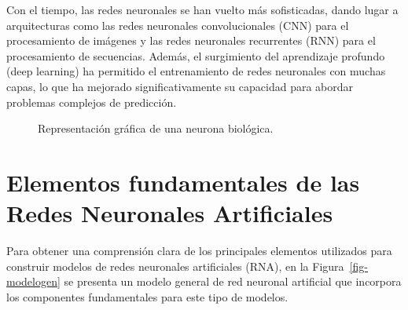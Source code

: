 \documentclass[
  us-letterpaper,
]{scrreprt}
\theoremstyle{plain}
\theoremstyle{definition}
\theoremstyle{definition}
\theoremstyle{plain}
\theoremstyle{remark}
\begin{document}
Con el tiempo, las redes neuronales se han vuelto más sofisticadas,
dando lugar a arquitecturas como las redes neuronales convolucionales
(CNN) para el procesamiento de imágenes y las redes neuronales
recurrentes (RNN) para el procesamiento de secuencias. Además, el
surgimiento del aprendizaje profundo (deep learning) ha permitido el
entrenamiento de redes neuronales con muchas capas, lo que ha mejorado
significativamente su capacidad para abordar problemas complejos de
predicción.

\begin{figure}


\caption{\label{fig-neubio}Representación gráfica de una neurona
biológica.}

\end{figure}%

\section{Elementos fundamentales de las Redes Neuronales
Artificiales}\label{elementos-fundamentales-de-las-redes-neuronales-artificiales}

Para obtener una comprensión clara de los principales elementos
utilizados para construir modelos de redes neuronales artificiales
(RNA), en la Figura~\ref{fig-modelogen} se presenta un modelo general de
red neuronal artificial que incorpora los componentes fundamentales para
este tipo de modelos.
\end{document}

